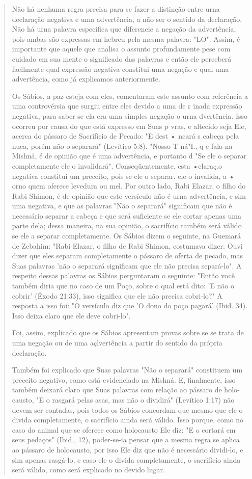 \begin{quote}
Não há nenhuma regra precisa para se fazer a distinção entre urna
declaração negativa e uma advertência, a não ser o sentido da
declaração. Não há urna palavra específica que diferencie a negação da
advertência, pois ambas são expressas em hebreu pela mesma palavra:
"LO". Assim, é importante que aquele que analisa o assunto profundamente
pese com cuidado em sua mente o significado das palavras e então ele
perceberá facilmente qual expressão ne­gativa constitui uma negação e
qual uma advertência, como já explicamos anteriormente.

Os Sábios, a paz esteja com eles, comentaram este assunto com
refe­rência a uma controvérsia que surgiu entre eles devido a uma de r
inada ex­pressão negativa, para saber se ela era uma simples negação o
urna dvertên­cia. Isso ocorreu por causa do que está expresso em Suas p
vras, e altecido seja Ele, acerca do pássaro de Sacrifício de Pecado: "E
dest • ncará s cabeça pela nuca, porém não o separará" (Levítico 5:8).
"Nosso T ná"I., q e fala na Mishná, é de opinião que é
uma advertência, e portanto d "Se ele o separar completamente ele o
invalidará". Conseqüentemente, esta •claraç.o negativa
constitui um preceito, pois se ele o separar, ele o invalida, a • orno
quem oferece levedura ou mel. Por outro lado, Rabi Elazar, o filho do
Rabi Shimon, é de opinião que este versículo não é urna advertência, e
sim uma negativa, e que as palavras "Não o separará" significam que não
é necessário separar a ca­beça e que será suficiente se ele cortar
apenas uma parte dela; dessa maneira, na sua opinião, o sacrifício
também será válido se ele a separar completamente. Os Sábios dizem o
seguinte, na Guemará de Zebahim: "Rabi Elazar, o filho de Rabi Shimon,
costumava dizer: Ouvi dizer que eles separam completamente o pássaro de
oferta de pecado, mas Suas palavras 'não o separará significam que ele
não precisa separá-lo". A respeito dessas palavras os Sábios perguntaram
o seguinte: "Então você também diria que no caso de um Poço, sobre o
qual está dito: 'E não o cobrir' (Êxodo 21:33), isso significa que ele não precisa
cobri-lo?" A resposta a isso foi: "O versículo diz que 'O dono do poço
pagará' (Ibid. 34). Isso deixa claro que ele deve cobri-lo".

Foi, assim, explicado que os Sábios apresentam provas sobre se se trata
de uma negação ou de uma açlvertência a partir do sentido da própria
declaração.

Também foi explicado que Suas palavras "Não o separará" consti­tuem um
preceito negativo, como está evidenciado na Mishná. E, finalmente, isso
também deixará claro que Suas palavras com relação ao pássaro de
holo­causto, "E o rasgará pelas asas, mas não o dividirá" (Levítico
1:17) não devem ser contadas, pois todos os Sábios concordam que mesmo
que ele o divida com­pletamente, o sacrifício ainda será válido. Isso
porque, como no caso do ani­mal que se oferece como holocausto Ele diz:
"E o cortará em seus pedaços" (Ibid., 12), poder-se-ia pensar que a
mesma regra se aplica ao pássaro de holo­causto, por isso Ele diz que
não é necessário dividi-lo, e sim apenas rasgá-lo, e caso ele o divida
completamente, o sacrifício ainda será válido, como será explicado no
devido lugar.


\end{quote}
